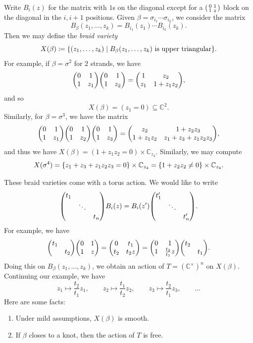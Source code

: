 \documentclass[leqno, openany]{memoir}
\theoremstyle{definition}
\theoremstyle{remark}
\theoremstyle{plain}
\theoremstyle{definition}
\theoremstyle{remark}
\newcommand{\C}{\mathbb{C}}
\newcommand{\1}{\mathbf{1}}
\newcommand{\2}{\mathbf{2}}
\newcommand{\3}{\mathbf{3}}
\begin{document}
Write $B_i(z)$ for the matrix with $1$s on the diagonal except for a $\begin{psmallmatrix}
    0 & 1 \\ 1 & z
\end{psmallmatrix}$ block on the diagonal in the $i, i+1$ positions. Given $\beta = \sigma_{i_1} \cdots \sigma_{i_k}$, we consider the matrix
\[ B_{\beta}(z_1, \ldots, z_k) = B_{i_1}(z_1) \cdots B_{i_k}(z_k). \]
Then we may define the \textit{braid variety}
\[ X(\beta) \coloneqq \qty{(z_1, \ldots, z_k) \mid B_{\beta}(z_1, \ldots, z_k) \text{ is upper triangular}}. \]
For example, if $\beta = \sigma^2$ for $2$ strands, we have
\[ \mqty(0 & 1 \\ 1 & z_1) \mqty(0 & 1 \\ 1 & z_2) = \mqty(1 & z_2 \\ z_1 & 1 + z_1 z_2), \]
and so 
\[ X(\beta) = (z_1 = 0) \subseteq \C^2. \]
Similarly, for $\beta = \sigma^3$, we have the matrix
\[ \mqty(0 & 1 \\ 1 & z_1) \mqty(0 & 1 \\ 1 & z_2) \mqty(0 & 1 \\ 1 & z_3) = \mqty(z_2 & 1+z_2z_3 \\ 1 + z_1 z_2 & z_1 + z_3 + z_1 z_2 z_3), \]
and thus we have $X(\beta) = (1 + z_1 z_2 = 0) \times \C_{z_3}$. Similarly, we may compute
\[ X(\sigma^4) = \qty{z_1 + z_3 + z_1 z_2 z_3 = 0} \times \C_{z_4} = \qty{1 + z_2 z_2 \neq 0} \times \C_{z_4}. \]

These braid varieties come with a torus action. We would like to write
\[ \mqty(\dmat{t_1,\ddots,t_n}) B_i(z) = B_i(z') \mqty(\dmat{t_1',\ddots,t_n'}). \]
For example, we have
\[ \mqty(\dmat{t_1,t_2}) \mqty(0 & 1 \\ 1 & z) = \mqty(0 & t_1 \\ t_2 & t_2 z) = \mqty(0 & 1 \\ 1 & \frac{t_2}{t_1}z) \mqty(\dmat{t_2,t_1}). \]
Doing this on $B_{\beta}(z_1, \ldots, z_k)$, we obtain an action of $T = {(\C^{\times})}^n$ on $X(\beta)$. Continuing our example, we have
\[ z_1 \mapsto \frac{t_2}{t_1} z_1, \qquad z_2 \mapsto \frac{t_1}{t_2} z_2, \qquad z_3 \mapsto \frac{t_2}{t_1} z_3, \qquad\ldots \]
Here are some facts:
\begin{enumerate}
    \item Under mild assumptions, $X(\beta)$ is smooth.
    \item If $\beta$ closes to a knot, then the action of $T$ is free.
\end{enumerate}
\end{document}
